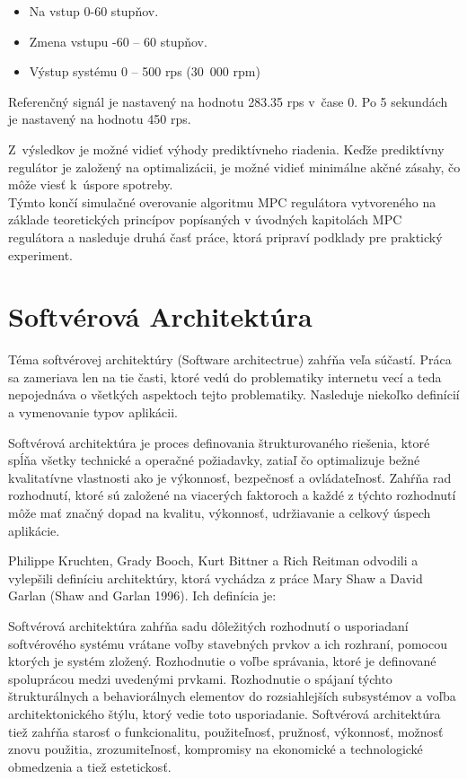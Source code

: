 \begin{itemize}
\item
  Na vstup 0-60 stupňov.
\item
  Zmena vstupu -60 -- 60 stupňov.
\item
  Výstup systému 0 -- 500 rps (30~000 rpm)
\end{itemize}

Referenčný signál je nastavený na hodnotu 283.35 rps v~čase 0. Po 5
sekundách je nastavený na hodnotu 450 rps.

Z~výsledkov je možné vidieť výhody prediktívneho riadenia. Keďže
prediktívny regulátor je založený na optimalizácii, je možné vidieť
minimálne akčné zásahy, čo môže viesť k~úspore spotreby.\cite{MPC08}\\
Týmto končí simulačné overovanie algoritmu MPC regulátora vytvoreného na základe teoretických princípov popísaných v úvodných kapitolách MPC regulátora a nasleduje druhá časť práce, ktorá pripraví podklady pre praktický experiment.

\section{Softvérová Architektúra}
Téma softvérovej architektúry (Software architectrue) zahŕňa veľa súčastí. Práca sa zameriava len na tie časti, ktoré vedú do problematiky internetu vecí a teda nepojednáva o všetkých aspektoch tejto problematiky. Nasleduje niekoľko definícií a vymenovanie typov aplikácii. 

\indent Softvérová architektúra je proces definovania štrukturovaného riešenia, ktoré spĺňa všetky technické a operačné požiadavky, zatiaľ čo optimalizuje bežné kvalitatívne vlastnosti ako je výkonnosť, bezpečnosť a ovládateľnosť. Zahŕňa rad rozhodnutí, ktoré sú založené na viacerých faktoroch a každé z týchto rozhodnutí môže mať značný dopad na kvalitu, výkonnosť, udržiavanie a celkový úspech aplikácie.

\indent Philippe Kruchten, Grady Booch, Kurt Bittner a Rich Reitman odvodili a vylepšili definíciu architektúry, ktorá vychádza z práce Mary Shaw a David Garlan (Shaw and Garlan 1996). Ich definícia je:

\indent Softvérová architektúra zahŕňa sadu dôležitých rozhodnutí o usporiadaní softvérového systému vrátane voľby stavebných prvkov a ich rozhraní, pomocou ktorých je systém zložený. Rozhodnutie o voľbe správania, ktoré je definované spoluprácou medzi uvedenými prvkami. Rozhodnutie o spájaní týchto štrukturálnych a behaviorálnych elementov do rozsiahlejších subsystémov a voľba architektonického štýlu, ktorý vedie toto usporiadanie. Softvérová architektúra tiež zahŕňa starosť o funkcionalitu, použiteľnosť, pružnosť, výkonnosť, možnosť znovu použitia, zrozumiteľnosť, kompromisy na ekonomické a technologické obmedzenia a tiež estetickosť. \cite{IOT02}


